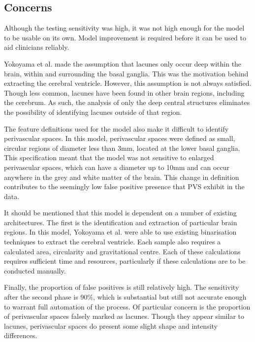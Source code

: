 \subsection*{Concerns}

Although the testing sensitivity was high, it was not high enough for the model to be usable on its own. Model improvement is required before it can be used to aid clinicians reliably.

Yokoyama et al. made the assumption that lacunes only occur deep within the brain, within and surrounding the basal ganglia. This was the motivation behind extracting the cerebral ventricle. However, this assumption is not always satisfied. Though less common, lacunes have been found in other brain regions, including the cerebrum. As such, the analysis of only the deep central structures eliminates the possibility of identifying lacunes outside of that region.

The feature definitions used for the model also make it difficult to identify perivascular spaces. In this model, perivascular spaces were defined as small, circular regions of diameter less than 3mm, located at the lower basal ganglia. This specification meant that the model was not sensitive to enlarged perivascular spaces, which can have a diameter up to 10mm and can occur anywhere in the grey and white matter of the brain. This change in definition contributes to the seemingly low false positive presence that PVS exhibit in the data.

It should be mentioned that this model is dependent on a number of existing architectures. The first is the identification and extraction of particular brain regions. In this model, Yokoyama et al. were able to use existing binarisation techniques to extract the cerebral ventricle. Each sample also requires a calculated area, circularity and gravitational centre. Each of these calculations requires sufficient time and resources, particularly if these calculations are to be conducted manually.

Finally, the proportion of false positives is still relatively high. The sensitivity after the second phase is 90\%, which is substantial but still not accurate enough to warrant full automation of the process. Of particular concern is the proportion of perivascular spaces falsely marked as lacunes. Though they appear similar to lacunes, perivascular spaces do present some slight shape and intensity differences.


